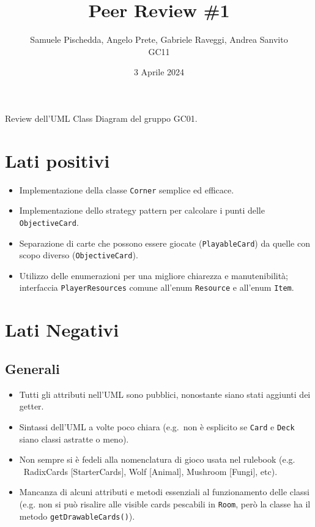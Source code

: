 \documentclass{article}
\title{Peer Review \#1}
\author{Samuele Pischedda, Angelo Prete, Gabriele Raveggi, Andrea Sanvito\\GC11}
\date{3 Aprile 2024}
\begin{document}
\maketitle

Review dell'UML Class Diagram del gruppo GC01.

\section{Lati positivi}

\begin{itemize}
  \item Implementazione della classe \texttt{Corner} semplice ed efficace.
  \item Implementazione dello strategy pattern per calcolare i punti delle \\\texttt{ObjectiveCard}.
  \item Separazione di carte che possono essere giocate (\texttt{PlayableCard}) da quelle con scopo diverso (\texttt{ObjectiveCard}).
  \item Utilizzo delle enumerazioni per una migliore chiarezza e manutenibilità; interfaccia \texttt{PlayerResources} comune all'enum \texttt{Resource} e all'enum \texttt{Item}.
\end{itemize}

\section{Lati Negativi}
\subsection{Generali}

\begin{itemize}
  \item Tutti gli attributi nell'UML sono pubblici, nonostante siano stati aggiunti dei getter.
  \item Sintassi dell'UML a volte poco chiara (e.g.~non è esplicito se \texttt{Card} e \texttt{Deck} siano classi astratte o meno).
  \item Non sempre si è fedeli alla nomenclatura di gioco usata nel rulebook (e.g. ~RadixCards [StarterCards], Wolf [Animal], Mushroom [Fungi], etc).
  \item Mancanza di alcuni attributi e metodi essenziali al funzionamento delle classi (e.g. non si può risalire alle visible cards pescabili in \texttt{Room}, però la classe ha il metodo \texttt{getDrawableCards()}).
\end{itemize}
\end{document}
